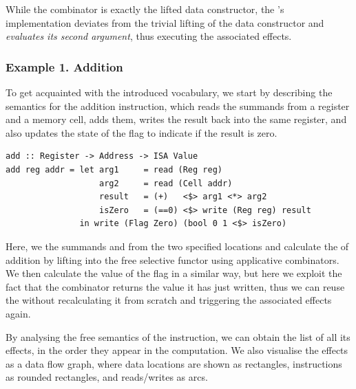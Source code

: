 \noindent
While the  combinator is exactly the lifted  data
constructor, the 's implementation deviates from the trivial lifting
of the  data constructor and \emph{evaluates its second argument},
thus executing the associated effects.

\subsubsection{Example 1. Addition}

To get acquainted with the introduced vocabulary, we start by describing the
semantics for the addition instruction, which reads the summands from a
register and a memory cell, adds them, writes the result back into the same
register, and also updates the state of the  flag to indicate if the
result is zero.

\begin{verbatim}
add :: Register -> Address -> ISA Value
add reg addr = let arg1     = read (Reg reg)
                   arg2     = read (Cell addr)
                   result   = (+)   <$> arg1 <*> arg2
                   isZero   = (==0) <$> write (Reg reg) result
               in write (Flag Zero) (bool 0 1 <$> isZero)
\end{verbatim}
\vspace{1mm}

\noindent
Here, we  the summands  and  from the two specified
locations and calculate the  of addition by lifting \hs{(+)} into the
free selective functor using applicative combinators. We then calculate the
value of the  flag in a similar way, but here we exploit the fact that
the  combinator returns the value it has just written, thus we can
reuse the  without recalculating it from scratch and triggering the
associated effects again.

By analysing the free semantics of the  instruction, we can obtain the
list of all its effects, in the order they appear in the computation. We also
visualise the effects as a data flow graph, where data locations are shown as
rectangles, instructions as rounded rectangles, and reads/writes as arcs.


